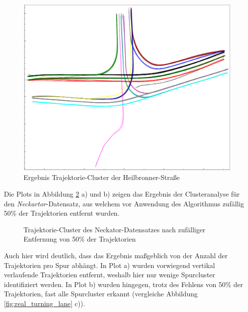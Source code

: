 \begin{figure}[H]
    \centering
    \includegraphics[width=0.31\linewidth]{resources/img/results/Heilbronner/filteredClusters_Heilbronner}
    \caption{Ergebnis Trajektorie-Cluster der Heilbronner-Straße}
    \label{fig:results_clusters_heilbronner}
\end{figure}

Die Plots in Abbildung \ref{fig:results_clusters_neckartor} a) und b) zeigen das Ergebnis der Clusteranalyse für
den \textit{Neckartor}-Datensatz, aus welchem vor Anwendung des Algorithmus zufällig 50\% der Trajektorien entfernt wurden.

\begin{figure}[H]
    \centering
    \qquad \qquad 
    \caption[Ergebnisse Test Clusteranalyse auf Neckartor Datensatz]
            {Trajektorie-Cluster des Neckator-Datensatzes nach zufälliger Entfernung von 50\% der Trajektorien}
    \label{fig:results_clusters_neckartor}
\end{figure}

Auch hier wird deutlich, dass das Ergebnis maßgeblich von der Anzahl der Trajektorien pro Spur abhängt.
In Plot a) wurden vorwiegend vertikal verlaufende Trajektorien entfernt, weshalb hier nur wenige Spurcluster identifiziert werden.
In Plot b) wurden hingegen, trotz des Fehlens von 50\% der Trajektorien, fast alle Spurcluster erkannt
(vergleiche Abbildung \ref{fig:real_turning_lane} c)).


